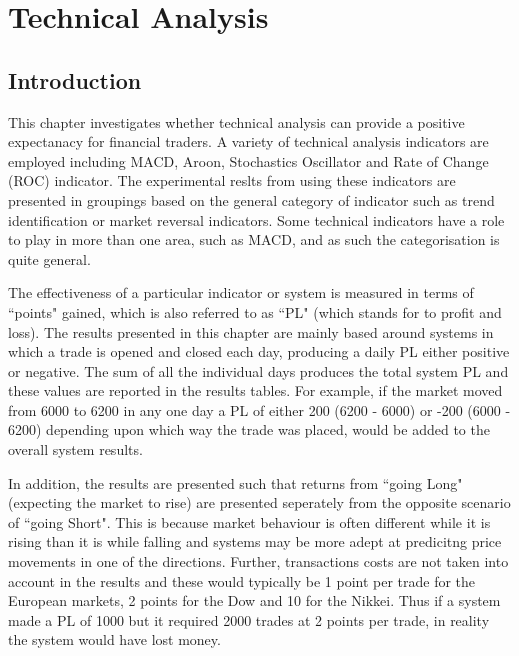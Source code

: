 
\chapter{Technical Analysis} %
 
\label{Chapter4} %


\section{Introduction}
This chapter investigates whether technical analysis can provide a positive expectanacy for financial traders. A variety of technical analysis indicators are employed including MACD, Aroon, Stochastics Oscillator and Rate of Change (ROC) indicator. The experimental reslts from using these indicators are presented in groupings based on the general category of indicator such as trend identification or market reversal indicators. Some technical indicators have a role to play in more than one area, such as MACD, and as such the categorisation is quite general.

The effectiveness of a particular indicator or system is measured in terms of \textquotedblleft points" gained, which is also referred to as \textquotedblleft PL" (which stands for to profit and loss). The results presented in this chapter are mainly based around systems in which a trade is opened and closed each day, producing a daily PL either positive or negative. The sum of all the individual days produces the total system PL and these values are reported in the results tables. For example, if the market moved from 6000 to 6200 in any one day a PL of either 200 (6200 - 6000) or -200 (6000 - 6200) depending upon which way the trade was placed, would be added to the overall system results. 

In addition, the results are presented such that returns from \textquotedblleft going Long" (expecting the market to rise) are presented seperately from the opposite scenario of \textquotedblleft going Short". This is because  market behaviour is often different while it is rising than it is while falling and systems may be more adept at predicitng price movements in one of the directions. Further, transactions costs are not taken into account in the results and these would typically be 1 point per trade for the European markets, 2 points for the Dow and 10 for the Nikkei.  Thus if a system made a PL of 1000 but it required 2000 trades at 2 points per trade, in reality the system would have lost money. 

